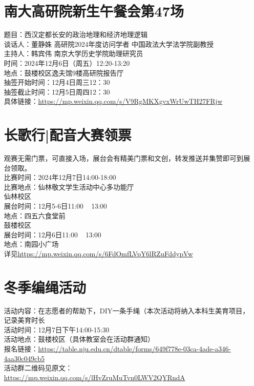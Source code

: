 \documentclass[letterpaper, 12pt]{article}
\begin{document}
\begin{multicols}{2}
\section{南大高研院新生午餐会第47场}
题目：西汉定都长安的政治地理和经济地理逻辑\\
谈话人：董静姝 高研院2024年度访问学者 中国政法大学法学院副教授\\
主持人：韩宾伟 南京大学历史学院助理研究员\\
时间：2024年12月6日（周五）12:20-13:20\\
地点：鼓楼校区逸夫馆9楼高研院报告厅\\
抽签开始时间：12月4日周三12：30\\
抽签截止时间：12月5日周四12：30\\
具体链接：\url{https://mp.weixin.qq.com/s/V9RgMKXgvxWrUwTH27FRjw}\\

\section{长歌行|配音大赛领票}
观赛无需门票，可直接入场，展台会有精美门票和文创，转发推送并集赞即可到展台领取。\\
比赛时间：2024年12月7日14:00-18:00\\
比赛地点：仙林敬文学生活动中心多功能厅\\
仙林校区\\
展台时间：12月5-6日11:00 ~ 13:00\\
地点：四五六食堂前\\
鼓楼校区\\
展台时间：12月6日11:00 ~ 13:00\\
地点：南园小广场\\
详见\url{https://mp.weixin.qq.com/s/6FdOmfLVpY6lRZuFddypVw}

\section{冬季编绳活动}
活动内容：在志愿者的帮助下，DIY一条手绳（本次活动将纳入本科生美育项目，记录美育时长\\
活动时间：12月7日下午14:00-15:30\\
活动地点：鼓楼校区（具体教室会在活动群通知）\\
报名链接：\url{https://table.nju.edu.cn/dtable/forms/649f778e-03ca-4ade-a346-4aa30c049cb5}\\
活动群二维码见原文：\url{https://mp.weixin.qq.com/s/lHvZruMuTvn0LWV2QYRndA}\\


\end{multicols}
\end{document}
